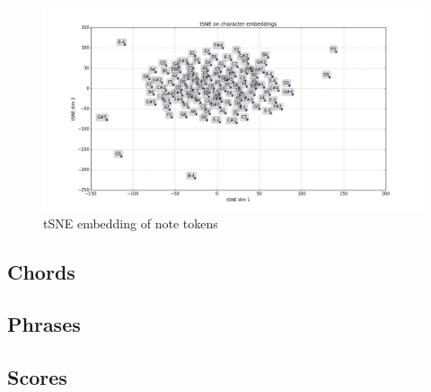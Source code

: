 \documentclass[dissertation.tex]{subfiles}
\begin{document}
\begin{figure}[htpb]
    \centering
    \includegraphics[width=0.8\linewidth]{Figures/tSNE-notes.png}
    \caption{tSNE embedding of note tokens}
    \label{fig:tsne-notes}
\end{figure}

\subsection{Chords}

\subsection{Phrases}

\subsection{Scores}
\end{document}
